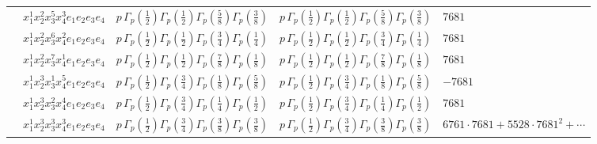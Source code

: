 \documentclass[11pt]{article}
\begin{document}
\begin{table}[ht]
{\begin{tabular}{@{}lllll@{}}
 & $x_{1}^{1} x_{2}^{2} x_{3}^{5} x_{4}^{3}  e_{1} e_{2} e_{3} e_{4}$ & $p \, \Gamma_p \left( \frac{1}{2} \right) \Gamma_p \left( \frac{1}{2} \right) \Gamma_p \left( \frac{5}{8} \right) \Gamma_p \left( \frac{3}{8} \right)$ & $p \, \Gamma_p \left( \frac{1}{2} \right) \Gamma_p \left( \frac{1}{2} \right) \Gamma_p \left( \frac{5}{8} \right) \Gamma_p \left( \frac{3}{8} \right)$ & $7681$ \\
 & $x_{1}^{1} x_{2}^{2} x_{3}^{6} x_{4}^{2}  e_{1} e_{2} e_{3} e_{4}$ & $p \, \Gamma_p \left( \frac{1}{2} \right) \Gamma_p \left( \frac{1}{2} \right) \Gamma_p \left( \frac{3}{4} \right) \Gamma_p \left( \frac{1}{4} \right)$ & $p \, \Gamma_p \left( \frac{1}{2} \right) \Gamma_p \left( \frac{1}{2} \right) \Gamma_p \left( \frac{3}{4} \right) \Gamma_p \left( \frac{1}{4} \right)$ & $7681$ \\
 & $x_{1}^{1} x_{2}^{2} x_{3}^{7} x_{4}^{1}  e_{1} e_{2} e_{3} e_{4}$ & $p \, \Gamma_p \left( \frac{1}{2} \right) \Gamma_p \left( \frac{1}{2} \right) \Gamma_p \left( \frac{7}{8} \right) \Gamma_p \left( \frac{1}{8} \right)$ & $p \, \Gamma_p \left( \frac{1}{2} \right) \Gamma_p \left( \frac{1}{2} \right) \Gamma_p \left( \frac{7}{8} \right) \Gamma_p \left( \frac{1}{8} \right)$ & $7681$ \\
 & $x_{1}^{1} x_{2}^{3} x_{3}^{1} x_{4}^{5}  e_{1} e_{2} e_{3} e_{4}$ & $p \, \Gamma_p \left( \frac{1}{2} \right) \Gamma_p \left( \frac{3}{4} \right) \Gamma_p \left( \frac{1}{8} \right) \Gamma_p \left( \frac{5}{8} \right)$ & $p \, \Gamma_p \left( \frac{1}{2} \right) \Gamma_p \left( \frac{3}{4} \right) \Gamma_p \left( \frac{1}{8} \right) \Gamma_p \left( \frac{5}{8} \right)$ & $-7681$ \\
 & $x_{1}^{1} x_{2}^{3} x_{3}^{2} x_{4}^{4}  e_{1} e_{2} e_{3} e_{4}$ & $p \, \Gamma_p \left( \frac{1}{2} \right) \Gamma_p \left( \frac{3}{4} \right) \Gamma_p \left( \frac{1}{4} \right) \Gamma_p \left( \frac{1}{2} \right)$ & $p \, \Gamma_p \left( \frac{1}{2} \right) \Gamma_p \left( \frac{3}{4} \right) \Gamma_p \left( \frac{1}{4} \right) \Gamma_p \left( \frac{1}{2} \right)$ & $7681$ \\
 & $x_{1}^{1} x_{2}^{3} x_{3}^{3} x_{4}^{3}  e_{1} e_{2} e_{3} e_{4}$ & $p \, \Gamma_p \left( \frac{1}{2} \right) \Gamma_p \left( \frac{3}{4} \right) \Gamma_p \left( \frac{3}{8} \right) \Gamma_p \left( \frac{3}{8} \right)$ & $p \, \Gamma_p \left( \frac{1}{2} \right) \Gamma_p \left( \frac{3}{4} \right) \Gamma_p \left( \frac{3}{8} \right) \Gamma_p \left( \frac{3}{8} \right)$ & $6761{\cdot}7681{+}5528{\cdot}7681^{2}{+}\cdots$ \\

\end{tabular}}
\end{table}
\end{document}
